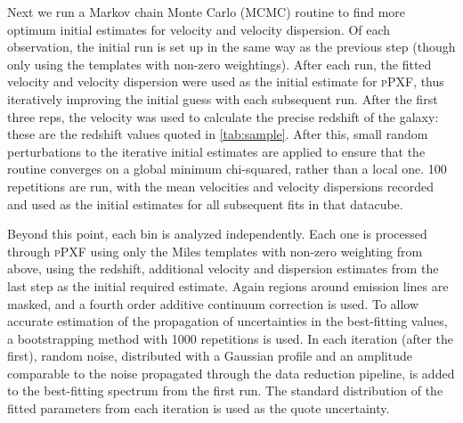 
		Next we run a Markov chain Monte Carlo (MCMC) routine to find more optimum initial estimates for velocity and velocity dispersion. Of each observation, the initial run is set up in the same way as the previous step (though only using the templates with non-zero weightings). After each run, the fitted velocity and velocity dispersion were used as the initial estimate for \textsc{pPXF}, thus iteratively improving the initial guess with each subsequent run. After the first three reps, the velocity was used to calculate the precise redshift of the galaxy: these are the redshift values quoted in \ref{tab:sample}. After this, small random perturbations to the iterative initial estimates are applied to ensure that the routine converges on a global minimum chi-squared, rather than a local one. 100 repetitions are run, with the mean velocities and velocity dispersions recorded and used as the initial estimates for all subsequent fits in that datacube. 

		Beyond this point, each bin is analyzed independently. Each one is processed through \textsc{pPXF} using only the Miles templates with non-zero weighting from above, using the redshift, additional velocity and dispersion estimates from the last step as the initial required estimate. Again regions around emission lines are masked, and a fourth order additive continuum correction is used. To allow accurate estimation of the propagation of uncertainties in the best-fitting values, a bootstrapping method with 1000 repetitions is used. In each iteration (after the first), random noise, distributed with a Gaussian profile and an amplitude comparable to the noise propagated through the data reduction pipeline, is added to the best-fitting spectrum from the first run. The standard distribution of the fitted parameters from each iteration is used as the quote uncertainty.


